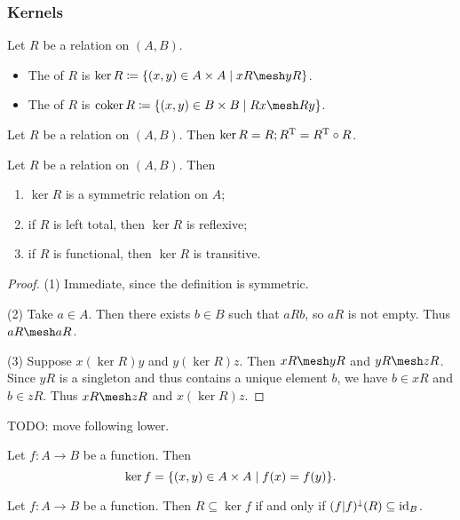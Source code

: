 \subsubsection{Kernels}

\begin{definition}
Let $R$ be a relation on $(A, B)$.
\begin{itemize}
\item The  of $R$ is $\ker R \defeq \setbuilder{(x,y)\in A\times A}{xR \mesh yR}$.
\item The  of $R$ is $\coker R \defeq \setbuilder{(x,y)\in B\times B}{Rx \mesh Ry}$.
\end{itemize}
\end{definition}

\begin{lemma}
Let $R$ be a relation on $(A, B)$. Then $\ker R = R;R^{\mathrm{T}} = R^{\mathrm{T}}\circ R$.
\end{lemma}

\begin{lemma} \label{kernelEquivalenceProperties}
Let $R$ be a relation on $(A, B)$. Then
\begin{enumerate}
\item $\ker R$ is a symmetric relation on $A$;
\item if $R$ is left total, then $\ker R$ is reflexive;
\item if $R$ is functional, then $\ker R$ is transitive.
\end{enumerate}
\end{lemma}
\begin{proof}
(1) Immediate, since the definition is symmetric.

(2) Take $a\in A$. Then there exists $b\in B$ such that $aRb$, so $aR$ is not empty. Thus $aR \mesh aR$.

(3) Suppose $x(\ker R)y$ and $y(\ker R)z$. Then $xR \mesh yR$ and $yR \mesh zR$. Since $yR$ is a singleton and thus contains a unique element $b$, we have $b\in xR$ and $b\in zR$. Thus $xR\mesh zR$ and $x(\ker R)z$.
\end{proof}


TODO: move following lower.
\begin{lemma}
Let $f:A\to B$ be a function. Then
\[ \ker f = \setbuilder{(x,y)\in A\times A}{f(x) = f(y)}. \]
\end{lemma}

\begin{lemma} \label{kernelSubrelationLemma}
Let $f:A\to B$ be a function. Then $R \subseteq \ker f$ \textup{if and only if} $(f|f)^\downarrow (R) \subseteq \operatorname{id}_B$.
\end{lemma}

